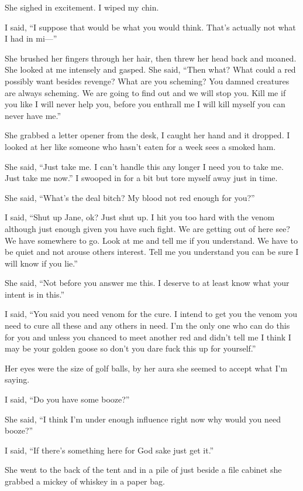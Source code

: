 She sighed in excitement. I wiped my chin.

I said, ``I suppose that would be what you would think. That's actually not what I had in mi---''

She brushed her fingers through her hair, then threw her head back and moaned. She looked at me intensely and gasped. She said, ``Then what? What could a red possibly want besides revenge? What are you scheming? You damned creatures are always scheming. We are going to find out and we will stop you. Kill me if you like I will never help you, before you enthrall me I will kill myself you can never have me.''

She grabbed a letter opener from the desk, I caught her hand and it dropped. I looked at her like someone who hasn't eaten for a week sees a smoked ham.

She said, ``Just take me. I can't handle this any longer I need you to take me. Just take me now.'' I swooped in for a bit but tore myself away just in time.

She said, ``What's the deal bitch? My blood not red enough for you?''

I said, ``Shut up Jane, ok? Just shut up. I hit you too hard with the venom although just enough given you have such fight. We are getting out of here see? We have somewhere to go. Look at me and tell me if you understand. We have to be quiet and not arouse others interest. Tell me you understand you can be sure I will know if you lie.''

She said, ``Not before you answer me this. I deserve to at least know what your intent is in this.''

I said, ``You said you need venom for the cure. I intend to get you the venom you need to cure all these and any others in need. I'm the only one who can do this for you and unless you chanced to meet another red and didn't tell me I think I may be your golden goose so don't you dare fuck this up for yourself.''

Her eyes were the size of golf balls, by her aura she seemed to accept what I'm saying.

I said, ``Do you have some booze?''

She said, ``I think I'm under enough influence right now why would you need booze?''

I said, ``If there's something here for God sake just get it.''

She went to the back of the tent and in a pile of just beside a file cabinet she grabbed a mickey of whiskey in a paper bag.


